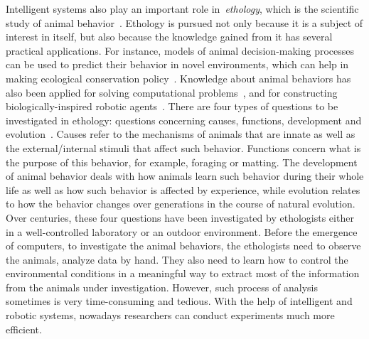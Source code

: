 Intelligent systems also play an important role in~\textit{ethology}, which is the scientific study of animal behavior~\cite{Bolhuis_2004}. Ethology is pursued not only because it is a subject of interest in itself, but also because the knowledge gained from it has several practical applications. For instance, models of animal decision-making processes can be used to predict their behavior in novel environments, which can help in making ecological conservation policy~\cite{Sutherland1998}. Knowledge about animal behaviors has also been applied for solving computational problems~\citep{Floreano2008}, and for constructing biologically-inspired robotic agents~\citep{Meyer2008}. There are four types of questions to be investigated in ethology: questions concerning causes, functions, development and evolution~\cite{Bolhuis_2004}. Causes refer to the mechanisms of animals that are innate as well as the external/internal stimuli that affect such behavior. Functions concern what is the purpose of this behavior, for example, foraging or matting. The development of animal behavior deals with how animals learn such behavior during their whole life as well as how such behavior is affected by experience, while evolution relates to how the behavior changes over generations in the course of natural evolution. Over centuries, these four questions have been investigated by ethologists either in a well-controlled laboratory or an outdoor environment. Before the emergence of computers, to investigate the animal behaviors, the ethologists need to observe the animals, analyze data by hand. They also need to learn how to control the environmental conditions in a meaningful way to extract most of the information from the animals under investigation. However, such process of analysis sometimes is very time-consuming and tedious. With the help of intelligent and robotic systems, nowadays researchers can conduct experiments much more efficient.


